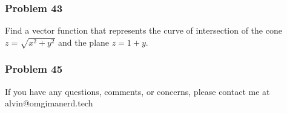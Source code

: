 \documentclass[letterpaper, 12pt]{math}
\begin{document}
\subsubsection*{Problem 43}
Find a vector function that represents the curve of intersection of the cone
\( z = \sqrt{x^2+y^2} \) and the plane \( z = 1+y \).

\subsubsection*{Problem 45}

\begin{center}
  If you have any questions, comments, or concerns, please contact me at
  alvin@omgimanerd.tech
\end{center}
\end{document}
